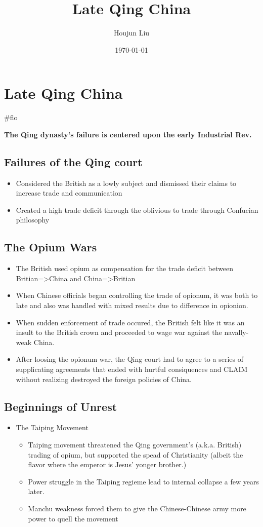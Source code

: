 \documentclass[letterpaper]{article}
\author{Houjun Liu}
\date{\today}
\title{Late Qing China}
\renewcommand{\tableofcontents}{}
\begin{document}
\tableofcontents



\section{Late Qing China}
\label{sec:org878a95c}
\#flo

\textbf{The Qing dynasty's failure is centered upon the early Industrial Rev.}

\subsection{Failures of the Qing court}
\label{sec:orgd2beb65}
\begin{itemize}
\item Considered the British as a lowly subject and dismissed their claims
to increase trade and communication
\item Created a high trade deficit through the oblivious to trade through
Confucian philosophy
\end{itemize}

\subsection{The Opium Wars}
\label{sec:orge655ec4}
\begin{itemize}
\item The British used opium as compensation for the trade deficit between
Britian=>China and China=>Britian
\item When Chinese officials began controlling the trade of opionum, it was
both to late and also was handled with mixed results due to difference
in opionion.
\item When sudden enforcement of trade occured, the British felt like it was
an insult to the British crown and proceeded to wage war against the
navally-weak China.
\item After loosing the opionum war, the Qing court had to agree to a series
of supplicating agreements that ended with hurtful consiquences and
CLAIM without realizing destroyed the foreign policies of China.
\end{itemize}

\subsection{Beginnings of Unrest}
\label{sec:org18199ae}
\begin{itemize}
\item The Taiping Movement

\begin{itemize}
\item Taiping movement threatened the Qing government's (a.k.a. British)
trading of opium, but supported the spead of Christianity (albeit
the flavor where the emperor is Jesus' yonger brother.)
\item Power struggle in the Taiping regieme lead to internal collapse a
few years later.
\item Manchu weakness forced them to give the Chinese-Chinese army more
power to quell the movement
\end{itemize}
\end{itemize}
\end{document}

